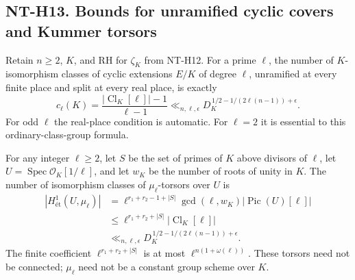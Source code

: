 \documentclass[11pt,a4paper]{article}
\begin{document}
\subsection*{NT-H13. Bounds for unramified cyclic covers and Kummer torsors}
Retain $n\ge2$, $K$, and RH for $\zeta_K$ from NT-H12.
For a prime $\ell$, the number of $K$-isomorphism classes of cyclic
extensions $E/K$ of degree $\ell$, unramified at every finite place
and split at every real place, is exactly
\[
 c_\ell(K)=\frac{|\operatorname{Cl}_K[\ell]|-1}{\ell-1}
       \ll_{n,\ell,\epsilon}
       D_K^{\,1/2-1/(2\ell(n-1))+\epsilon}.             \tag{NT-H13a}
\]
For odd $\ell$ the real-place condition is automatic. For $\ell=2$
it is essential to this ordinary-class-group formula.

For any integer $\ell\ge2$, let $S$ be the set of primes of $K$
above divisors of $\ell$, let $U=\operatorname{Spec}\mathcal O_K[1/\ell]$,
and let $w_K$ be the number of roots of unity in $K$. The number of
isomorphism classes of $\mu_\ell$-torsors over $U$ is
\[
 \begin{split}
 |H^1_{\text{ét}}(U,\mu_\ell)|
  &=\ell^{r_1+r_2-1+|S|}\gcd(\ell,w_K)
                             |\operatorname{Pic}(U)[\ell]|\\
  &\le\ell^{r_1+r_2+|S|}|\operatorname{Cl}_K[\ell]|\\
  &\ll_{n,\ell,\epsilon}
                 D_K^{\,1/2-1/(2\ell(n-1))+\epsilon}.
 \end{split}                                           \tag{NT-H13b}
\]
The finite coefficient $\ell^{r_1+r_2+|S|}$ is at most
$\ell^{n(1+\omega(\ell))}$. These torsors need not be connected;
$\mu_\ell$ need not be a constant group scheme over $K$.
\end{document}
